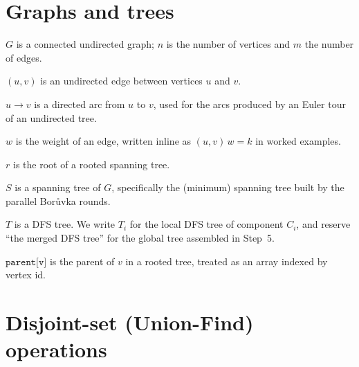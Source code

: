 \section*{Graphs and trees}

\begin{ppdefn}
 $G$ is a connected undirected graph; $n$ is the
number of vertices and $m$ the number of edges.
\end{ppdefn}

\begin{ppdefn}
 $(u, v)$ is an undirected edge between vertices $u$ and
$v$.
\end{ppdefn}

\begin{ppdefn}
 $u \to v$ is a directed arc from $u$ to $v$,
used for the arcs produced by an Euler tour of an undirected tree.
\end{ppdefn}

\begin{ppdefn}
 $w$ is the weight of an edge, written inline as
$(u, v)\,w{=}k$ in worked examples.
\end{ppdefn}

\begin{ppdefn}
 $r$ is the root of a rooted spanning tree.
\end{ppdefn}

\begin{ppdefn}
 $S$ is a spanning tree of $G$, specifically the
(minimum) spanning tree built by the parallel Bor{\r u}vka rounds.
\end{ppdefn}

\begin{ppdefn}
 $T$ is a DFS tree.  We write $T_i$ for the local
DFS tree of component $C_i$, and reserve ``the merged DFS tree'' for
the global tree assembled in Step~5.
\end{ppdefn}

\begin{ppdefn}
 $\texttt{parent[v]}$ is the parent of $v$ in
a rooted tree, treated as an array indexed by vertex id.
\end{ppdefn}

\section*{Disjoint-set (Union-Find) operations}

